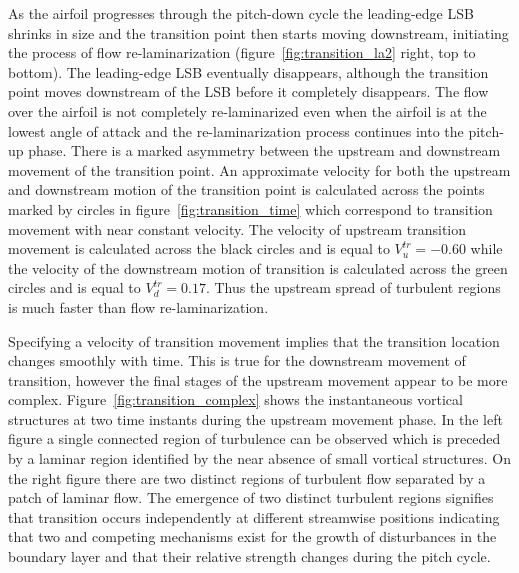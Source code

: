As the airfoil progresses through the pitch-down cycle the leading-edge LSB shrinks in size and the transition point then starts moving downstream, initiating the process of flow re-laminarization (figure~\ref{fig:transition_la2} right, top to bottom). The leading-edge LSB eventually disappears, although the transition point moves downstream of the LSB before it completely disappears. The flow over the airfoil is not completely re-laminarized even when the airfoil is at the lowest angle of attack and the re-laminarization process continues into the pitch-up phase. There is a marked asymmetry between the upstream and downstream movement of the transition point. An approximate velocity for both the upstream and downstream motion of the transition point is calculated across the points marked by circles in figure~\ref{fig:transition_time} which correspond to transition movement with near constant velocity. The velocity of upstream transition movement is calculated across the black circles and is equal to $V^{tr}_{u}=-0.60$ while the velocity of the downstream motion of transition is calculated across the green circles and is equal to $V^{tr}_{d}=0.17$. Thus the upstream spread of turbulent regions is much faster than flow re-laminarization. %

Specifying a velocity of transition movement implies that the transition location changes smoothly with time. This is true for the downstream movement of transition, however the final stages of the upstream movement appear to be more complex. Figure~\ref{fig:transition_complex} shows the instantaneous vortical structures at two time instants during the upstream movement phase. In the left figure a single connected region of turbulence can be observed which is preceded by a laminar region identified by the near absence of small vortical structures. On the right figure there are two distinct regions of turbulent flow separated by a patch of laminar flow. The emergence of two distinct turbulent regions signifies that transition occurs independently at different streamwise positions indicating that two and competing mechanisms exist for the growth of disturbances in the boundary layer and that their relative strength changes during the pitch cycle.

